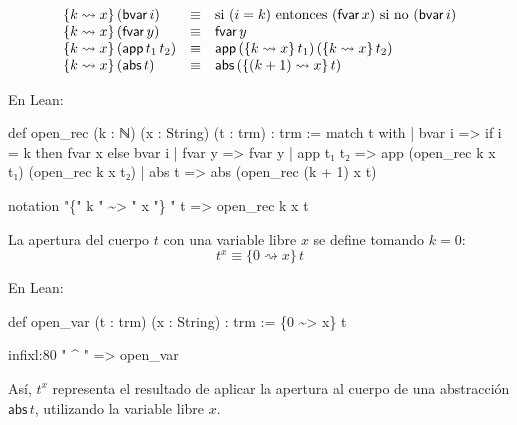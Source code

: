\documentclass[
  spanish,
  letterpaper,
  DIV=11,
  numbers=noendperiod]{scrreprt}
\newenvironment{Shaded}{\begin{snugshade}}{\end{snugshade}}
\newcommand{\KeywordTok}[1]{\textcolor[rgb]{0.00,0.23,0.31}{\textbf{#1}}}
\newcommand{\NormalTok}[1]{\textcolor[rgb]{0.00,0.23,0.31}{#1}}
\newcommand{\StringTok}[1]{\textcolor[rgb]{0.13,0.47,0.30}{#1}}
\renewcommand{\NormalTok}[1]{\textcolor[HTML]{000000}{#1}}
\renewcommand{\KeywordTok}[1]{\textcolor[HTML]{0000FF}{#1}}
\renewcommand{\StringTok}[1]{\textcolor[HTML]{A52A2A}{#1}}
\theoremstyle{remark}
\begin{document}
\[
\begin{array}{l c l}
\{k \rightsquigarrow x\} \, (\mathsf{bvar}\, i) & \equiv & \text{si } (i = k) \text{ entonces } (\mathsf{fvar}\, x) \text{ si no } (\mathsf{bvar}\, i) \\ 
\{k \rightsquigarrow x\} \, (\mathsf{fvar}\, y) & \equiv & \mathsf{fvar}\, y \\ 
\{k \rightsquigarrow x\} \, (\mathsf{app}\, t_1 \, t_2) & \equiv & \mathsf{app}\, (\{k \rightsquigarrow x \} \, t_1) \, (\{k \rightsquigarrow x\} \, t_2) \\ 
\{k \rightsquigarrow x\} \, (\mathsf{abs}\, t) & \equiv & \mathsf{abs}\, (\{(k + 1) \rightsquigarrow x\} \, t)
\end{array}
\]

En Lean:

\begin{Shaded}
\begin{Highlighting}[]
\KeywordTok{def}\NormalTok{ open\_rec (k : ℕ) (x : String) (t : trm) : trm :=}
  \KeywordTok{match}\NormalTok{ t }\KeywordTok{with}
\NormalTok{  | bvar i    =\textgreater{} if i = k then fvar x else bvar i}
\NormalTok{  | fvar y    =\textgreater{} fvar y}
\NormalTok{  | app t₁ t₂ =\textgreater{} app (open\_rec k x t₁) (open\_rec k x t₂)}
\NormalTok{  | abs t     =\textgreater{} abs (open\_rec (k + 1) x t)}

\KeywordTok{notation} \StringTok{"\{"}\NormalTok{ k }\StringTok{" \textasciitilde{}\textgreater{} "}\NormalTok{ x }\StringTok{"\} "}\NormalTok{ t =\textgreater{} open\_rec k x t}
\end{Highlighting}
\end{Shaded}

La apertura del cuerpo \(t\) con una variable libre \(x\) se define
tomando \(k=0\): \[
t^x \equiv \{ 0 \rightsquigarrow x \} \, t
\]

En Lean:

\begin{Shaded}
\begin{Highlighting}[]
\KeywordTok{def}\NormalTok{ open\_var (t : trm) (x : String) : trm :=}
\NormalTok{  \{0 \textasciitilde{}\textgreater{} x\} t}

\NormalTok{infixl:80 }\StringTok{" \^{} "}\NormalTok{ =\textgreater{} open\_var}
\end{Highlighting}
\end{Shaded}

Así, \(t^x\) representa el resultado de aplicar la apertura al cuerpo de
una abstracción \(\mathsf{abs} \, t\), utilizando la variable libre
\(x\).
\end{document}
